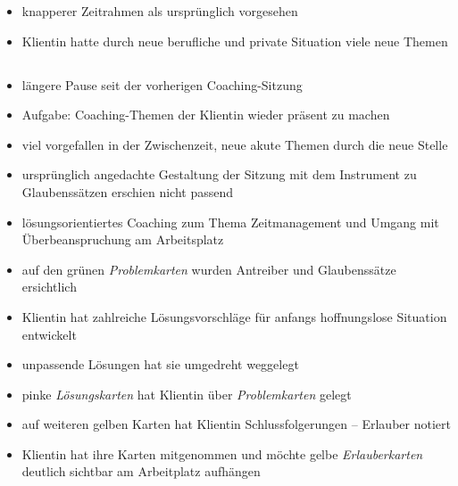 \documentclass[11pt,a4paper]{article}
\begin{document}
\begin{itemize}

	\item knapperer Zeitrahmen als ursprünglich vorgesehen

	\item Klientin hatte durch neue berufliche und private Situation viele neue Themen

\end{itemize}


\subsection*{\color{Orange}{Vierte Sitzung: Lösungsorientiertes Coaching}}


\begin{itemize}

	
	\item längere Pause seit der vorherigen Coaching-Sitzung
	
	\item Aufgabe: Coaching-Themen der Klientin wieder präsent zu machen
	
	\item viel vorgefallen in der Zwischenzeit, neue akute Themen durch die neue Stelle
	
	\item ursprünglich angedachte Gestaltung der Sitzung mit dem Instrument zu Glaubenssätzen erschien nicht passend
	
	\item lösungsorientiertes Coaching zum Thema Zeitmanagement und Umgang mit Überbeanspruchung am Arbeitsplatz
	
	\item auf den grünen \textsl{Problemkarten} wurden Antreiber und Glaubenssätze ersichtlich
	
	\item Klientin hat zahlreiche Lösungsvorschläge für anfangs hoffnungslose Situation entwickelt
	
	\item unpassende Lösungen hat sie umgedreht weggelegt	
	
	\item pinke \textsl{Lösungskarten} hat Klientin über \textsl{Problemkarten} gelegt
	
	\item auf weiteren gelben Karten hat Klientin Schlussfolgerungen -- Erlauber notiert
	
	\item Klientin hat ihre Karten mitgenommen und möchte gelbe \textsl{Erlauberkarten} deutlich sichtbar am Arbeitplatz aufhängen


\end{itemize}
\end{document}

